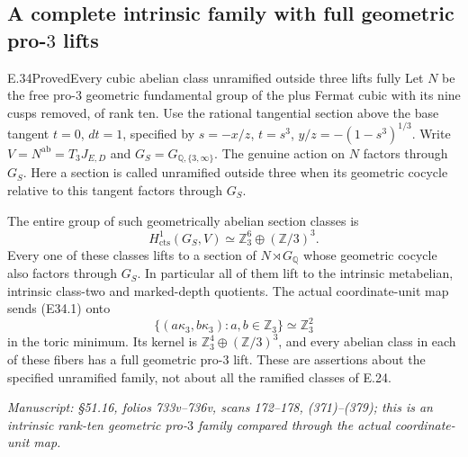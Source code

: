 \subsection{A complete intrinsic family with full geometric pro-\texorpdfstring{$3$}{3} lifts}

\begin{statement}{E.34}{Proved}{Every cubic abelian class unramified outside three lifts fully}
Let $N$ be the free pro-$3$ geometric fundamental group of the
plus Fermat cubic with its nine cusps removed, of rank ten.
Use the rational tangential section above the base tangent
$t=0$, $dt=1$, specified by
$s=-x/z$, $t=s^3$, $y/z=-(1-s^3)^{1/3}$.
Write $V=N^{\mathrm{ab}}=T_3J_{E,D}$ and
$G_S=G_{\mathbb Q,\{3,\infty\}}$.
The genuine action on $N$ factors through $G_S$.
Here a section is called unramified outside three when its
geometric cocycle relative to this tangent factors through $G_S$.

The entire group of such geometrically abelian section classes is
\[
 H^1_{\mathrm{cts}}(G_S,V)
       \simeq \mathbb Z_3^6\oplus(\mathbb Z/3)^3 .
 \tag{E34.1}
\]
Every one of these classes lifts to a section of
$N\rtimes G_{\mathbb Q}$ whose geometric cocycle also factors
through $G_S$. In particular all of them lift to the intrinsic
metabelian, intrinsic class-two and marked-depth quotients.
The actual coordinate-unit map sends (E34.1) onto
\[
 \{(a\kappa_3,b\kappa_3):a,b\in\mathbb Z_3\}
       \simeq\mathbb Z_3^2
 \tag{E34.2}
\]
in the toric minimum. Its kernel is
$\mathbb Z_3^4\oplus(\mathbb Z/3)^3$, and every abelian class
in each of these fibers has a full geometric pro-$3$ lift.
These are assertions about the specified unramified family,
not about all the ramified classes of E.24.

\emph{Manuscript: \S51.16, folios 733v--736v, scans 172--178,
(371)--(379); this is an intrinsic rank-ten geometric pro-$3$
family compared through the actual coordinate-unit map.}
\end{statement}

